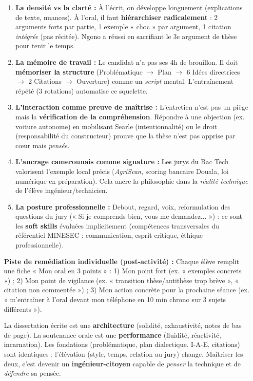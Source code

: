\documentclass[11pt]{article}
\begin{document}
\begin{enumerate}
    \item \textbf{La densité vs la clarté :} À l'écrit, on développe longuement (explications de texte, nuances). À l'oral, il faut \textbf{hiérarchiser radicalement} : 2 arguments forts par partie, 1 exemple « choc » par argument, 1 citation \emph{intégrée} (pas récitée). Ngono a réussi en sacrifiant le 3e argument de thèse pour tenir le temps.
    \item \textbf{La mémoire de travail :} Le candidat n'a pas ses 4h de brouillon. Il doit \textbf{mémoriser la structure} (Problématique $\rightarrow$ Plan $\rightarrow$ 6 Idées directrices $\rightarrow$ 2 Citations $\rightarrow$ Ouverture) comme un \emph{script} mental. L'entraînement répété (3 rotations) automatise ce squelette.
    \item \textbf{L'interaction comme preuve de maîtrise :} L'entretien n'est pas un piège mais la \textbf{vérification de la compréhension}. Répondre à une objection (ex. voiture autonome) en mobilisant Searle (intentionnalité) ou le droit (responsabilité du constructeur) prouve que la thèse n'est pas apprise par cœur mais \emph{pensée}.
    \item \textbf{L'ancrage camerounais comme signature :} Les jurys du Bac Tech valorisent l'exemple local précis (\emph{AgriScan}, scoring bancaire Douala, loi numérique en préparation). Cela ancre la philosophie dans la \emph{réalité technique} de l'élève ingénieur/technicien.
    \item \textbf{La posture professionnelle :} Debout, regard, voix, reformulation des questions du jury (« Si je comprends bien, vous me demandez... ») : ce sont les \textbf{soft skills} évaluées implicitement (compétences transversales du référentiel MINESEC : communication, esprit critique, éthique professionnelle).
\end{enumerate}

\noindent\textbf{Piste de remédiation individuelle (post-activité) :} Chaque élève remplit une fiche « Mon oral en 3 points » : 1) Mon point fort (ex. « exemples concrets ») ; 2) Mon point de vigilance (ex. « transition thèse/antithèse trop brève », « citation non commentée ») ; 3) Mon action concrète pour la prochaine séance (ex. « m'entraîner à l'oral devant mon téléphone en 10 min chrono sur 3 sujets différents »).

\begin{aretenir}
La dissertation écrite est une \textbf{architecture} (solidité, exhaustivité, notes de bas de page). La soutenance orale est une \textbf{performance} (fluidité, réactivité, incarnation). Les fondations (problématique, plan dialectique, I-A-E, citations) sont identiques ; l'élévation (style, temps, relation au jury) change. Maîtriser les deux, c'est devenir un \textbf{ingénieur-citoyen} capable de \emph{penser} la technique et de \emph{défendre} sa pensée.
\end{aretenir}
\end{document}
